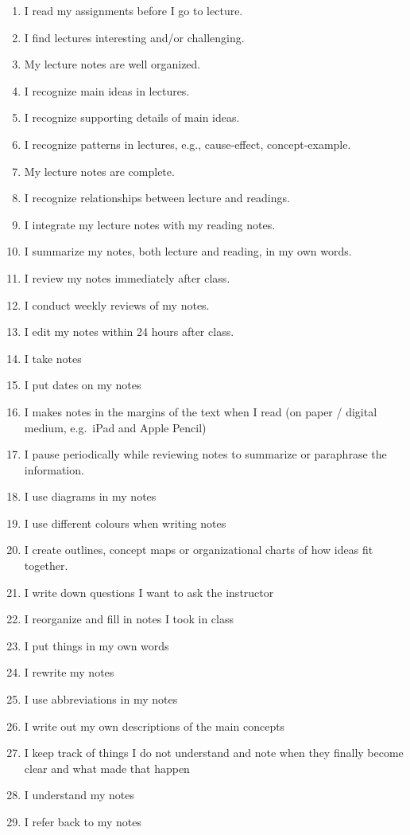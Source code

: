 \documentclass[letterpaper, nobind]{templates/ociamthesis}
\providecommand{\tightlist}{%
  \setlength{\itemsep}{0pt}\setlength{\parskip}{0pt}}
\begin{document}
\begin{enumerate}
\def\labelenumi{\arabic{enumi}.}
\setcounter{enumi}{2}
\tightlist
\item
  I read my assignments before I go to lecture.
\item
  I find lectures interesting and/or challenging.
\item
  My lecture notes are well organized.
\item
  I recognize main ideas in lectures.
\item
  I recognize supporting details of main ideas.
\item
  I recognize patterns in lectures, e.g., cause-effect, concept-example.
\item
  My lecture notes are complete.
\item
  I recognize relationships between lecture and readings.
\item
  I integrate my lecture notes with my reading notes.
\item
  I summarize my notes, both lecture and reading, in my own words.
\item
  I review my notes immediately after class.
\item
  I conduct weekly reviews of my notes.
\item
  I edit my notes within 24 hours after class.
\item
  I take notes
\item
  I put dates on my notes
\item
  I makes notes in the margins of the text when I read (on paper / digital medium, e.g.~iPad and Apple Pencil)
\item
  I pause periodically while reviewing notes to summarize or paraphrase the information.
\item
  I use diagrams in my notes
\item
  I use different colours when writing notes
\item
  I create outlines, concept maps or organizational charts of how ideas fit together.
\item
  I write down questions I want to ask the instructor
\item
  I reorganize and fill in notes I took in class
\item
  I put things in my own words
\item
  I rewrite my notes
\item
  I use abbreviations in my notes
\item
  I write out my own descriptions of the main concepts
\item
  I keep track of things I do not understand and note when they finally become clear and what made that happen
\item
  I understand my notes
\item
  I refer back to my notes
\end{enumerate}
\end{document}
